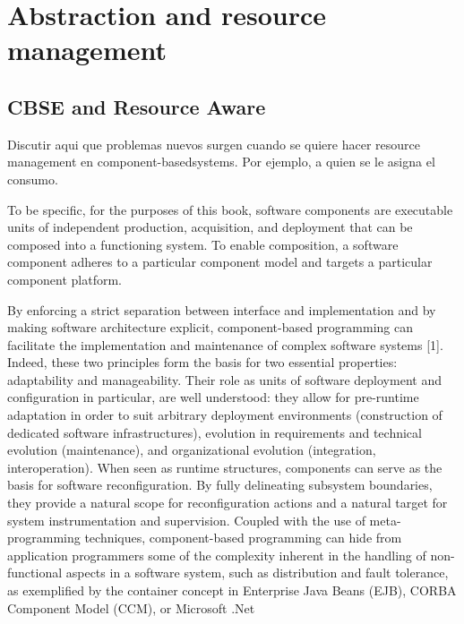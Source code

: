 \chapter{Abstraction and resource management}
\label{chap:abstractions_and_resource_management}


\section{CBSE and Resource Aware}


Discutir aqui que problemas nuevos surgen cuando se quiere hacer resource management en component-basedsystems. Por ejemplo, a quien se le asigna el consumo.

To be specific, for the purposes of this book, software components
are executable units of independent production, acquisition, and deployment
that can be composed into a functioning system. To enable composition, a
software component adheres to a particular component model and targets a
particular component platform.

By enforcing a strict separation between interface and implementation and by making software
architecture explicit, component-based programming can facilitate the implementation and
maintenance of complex software systems [1]. Indeed, these two principles form the basis for two
essential properties: adaptability and manageability. Their role as units of software deployment and
configuration in particular, are well understood: they allow for pre-runtime adaptation in order to
suit arbitrary deployment environments (construction of dedicated software infrastructures), evolution
in requirements and technical evolution (maintenance), and organizational evolution (integration,
interoperation). When seen as runtime structures, components can serve as the basis for software
reconfiguration. By fully delineating subsystem boundaries, they provide a natural scope for
reconfiguration actions and a natural target for system instrumentation and supervision. Coupled with
the use of meta-programming techniques, component-based programming can hide from application
programmers some of the complexity inherent in the handling of non-functional aspects in a software
system, such as distribution and fault tolerance, as exemplified by the container concept in Enterprise
Java Beans (EJB), CORBA Component Model (CCM), or Microsoft .Net

